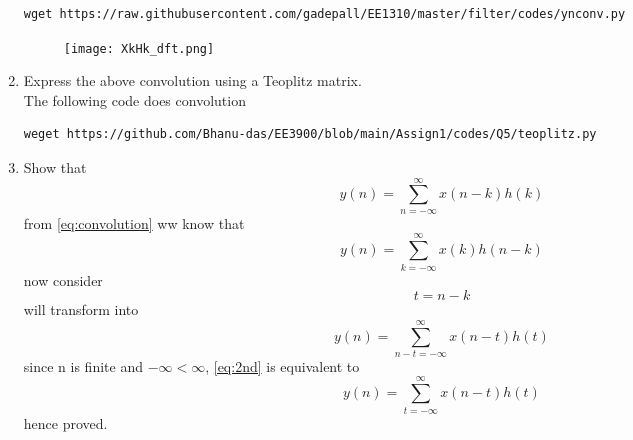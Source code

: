 \documentclass[journal,12pt,twocolumn]{IEEEtran}
\renewcommand\thesection{\arabic{section}}
\begin{document}
\begin{enumerate}[label=\thesection.\arabic*]
%
\begin{lstlisting}
wget https://raw.githubusercontent.com/gadepall/EE1310/master/filter/codes/ynconv.py
\end{lstlisting}
\begin{figure}[!ht]
\centering
\texttt{[image: XkHk\_dft.png]}
\caption{}
\label{fig:XkHk_dft}
\end{figure}
\item Express the above convolution using a Teoplitz matrix.
\\
\solution
The following code does convolution
\begin{lstlisting}
weget https://github.com/Bhanu-das/EE3900/blob/main/Assign1/codes/Q5/teoplitz.py
\end{lstlisting}
\item Show that
\begin{equation}
y(n) =  \sum_{n=-\infty}^{\infty}x(n-k)h(k)
\end{equation}
\solution from \ref{eq:convolution} ww know that
\begin{equation}
y(n) =  \sum_{k=-\infty}^{\infty}x(k)h(n-k) \label{eq:1st}
\end{equation}
now consider
\begin{equation}
    t = n-k
\end{equation}
will transform into 
\begin{equation}
y(n) =  \sum_{n-t=-\infty}^{\infty}x(n-t)h(t) \label{eq:2nd}
\end{equation}
since n is finite and $-\infty < \infty$, \ref{eq:2nd} is equivalent to 
\begin{equation}
y(n) =  \sum_{t=-\infty}^{\infty}x(n-t)h(t) \label{eq:3nd}
\end{equation}
hence proved.
\end{enumerate}

%
\end{document}
